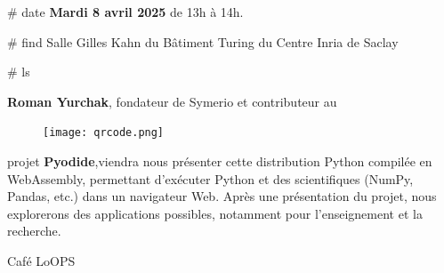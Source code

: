 \documentclass[final]{beamer}
\newlength{\twocolwid}
\begin{document}
\begin{frame}[t]
\begin{columns}[t]
\begin{column}{\twocolwid}
\begin{block}{\# date}
				 \textbf{Mardi 8 avril 2025} de 13h \`{a} 14h.

			\end{block}


			\begin{block}{\# find}
				 Salle Gilles Kahn du B\^{a}timent Turing du Centre Inria de Saclay
			\end{block}

			\begin{block}{\# ls}


				 \textbf{Roman Yurchak}, fondateur de Symerio et contributeur au

				\begin{figure}
					\centering
					\texttt{[image: qrcode.png]}
				\end{figure}

				projet \textbf{Pyodide},viendra nous pr\'{e}senter cette distribution Python compil\'{e}e
				en WebAssembly, permettant d'ex\'{e}cuter Python et des scientifiques
				(NumPy, Pandas, etc.) dans un navigateur Web.
				Apr\`{e}s une pr\'{e}sentation du projet, nous explorerons des applications
				possibles, notamment pour l’enseignement et la recherche.

				\vspace{-0.5in}

			\end{block}












			\begin{alertblock}{\Large{Caf\'{e} LoOPS}}
			\end{alertblock}



\end{column}
\end{columns}
\end{frame}
\end{document}
